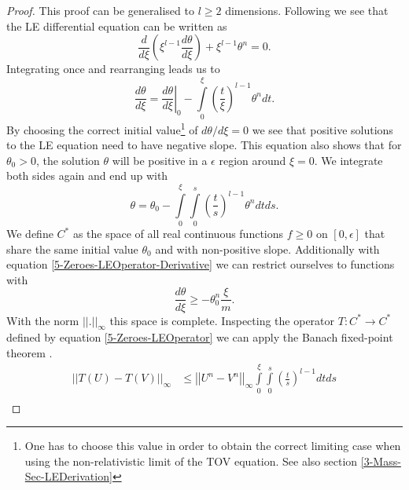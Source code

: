 \begin{proof}
	This proof can be generalised to $l\geq2$ dimensions. 
	Following \cite{quittnerSuperlinearParabolicProblems2007a} we see that the LE differential equation can be written as
	\begin{equation}
		\frac{d}{d\xi}\left(\xi^{l-1}\frac{d\theta}{d\xi}\right) + \xi^{l-1}\theta^n = 0.
	\end{equation}
	Integrating once and rearranging leads us to
	\begin{equation}
		\frac{d\theta}{d\xi} = \left.\frac{d\theta}{d\xi}\right|_0 - \int\limits_0^\xi\left(\frac{t}{\xi}\right)^{l-1}\theta^ndt.
		\label{5-Zeroes-LEOperator-Derivative}
	\end{equation}
	By choosing the correct initial value\footnote{One has to choose this value in order to obtain the correct limiting case when using the non-relativistic limit of the \ac{TOV} equation. See also section \ref{3-Mass-Sec-LEDerivation}} of $d\theta/d\xi=0$ we see that positive solutions to the LE equation need to have negative slope.
	This equation also shows that for $\theta_0>0$, the solution $\theta$ will be positive in a $\epsilon$ region around $\xi=0$.
	We integrate both sides again and end up with
	\begin{equation}
		\theta = \theta_0 - \int\limits_0^\xi\int\limits_0^s\left(\frac{t}{s}\right)^{l-1}\theta^ndtds.
		\label{5-Zeroes-LEOperator}
	\end{equation}
	We define $C^*$ as the space of all real continuous functions $f\geq0$ on $[0,\epsilon]$ that share the same initial value $\theta_0$ and with non-positive slope. %
	Additionally with equation \eqref{5-Zeroes-LEOperator-Derivative} we can restrict ourselves to functions with
	\begin{equation}
		\frac{d\theta}{d\xi} \geq -\theta_0^n\frac{\xi}{m}.
		\label{5-Zeroes-LEOperator-Restrict-Slope}
	\end{equation}
	With the norm $||.||_\infty$ this space is complete.
	Inspecting the operator $T:C^*\rightarrow C^*$ defined by
	equation \ref{5-Zeroes-LEOperator} we can apply the Banach fixed-point theorem \cite{banachOperationsDansEnsembles1922}.
	\begin{align}
		||T(U)-T(V)||_\infty	&\leq	\left|\left|U^n-V^n\right|\right|_\infty\int\limits_0^\xi\int\limits_0^s \left(\frac{t}{s}\right)^{l-1}dtds\\

\end{align}
\end{proof}
